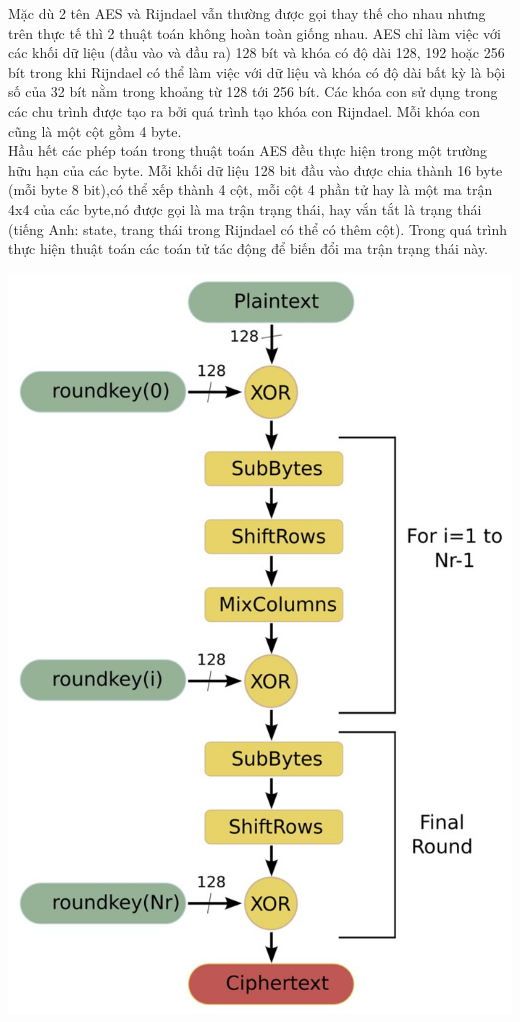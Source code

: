 \documentclass[paper=a4, fontsize=11pt]{scrartcl}	%
\numberwithin{equation}{section}															%
\numberwithin{figure}{section}																%
\numberwithin{table}{section}																%
\begin{document}
    
	Mặc dù 2 tên AES và Rijndael vẫn thường được gọi thay thế cho nhau nhưng trên thực tế thì 2 thuật toán không hoàn toàn giống nhau. AES chỉ làm việc với các khối dữ liệu (đầu vào và đầu ra) 128 bít và khóa có độ dài 128, 192 hoặc 256 bít trong khi Rijndael có thể làm việc với dữ liệu và khóa có độ dài bất kỳ là bội số của 32 bít nằm trong khoảng từ 128 tới 256 bít. Các khóa con sử dụng trong các chu trình được tạo ra bởi quá trình tạo khóa con Rijndael. Mỗi khóa con cũng là một cột gồm 4 byte.\\
	
	
	Hầu hết các phép toán trong thuật toán AES đều thực hiện trong một trường hữu hạn của các byte. Mỗi khối dữ liệu 128 bit đầu vào được chia thành 16 byte (mỗi byte 8 bit),có thể xếp thành 4 cột, mỗi cột 4 phần tử hay là một ma trận 4x4 của các byte,nó được gọi là ma trận trạng thái, hay vắn tắt là trạng thái (tiếng Anh: state, trang thái trong Rijndael có thể có thêm cột). Trong quá trình thực hiện thuật toán các toán tử tác động để biến đổi ma trận trạng thái này.	\\
	


	\begin{center}
		\includegraphics[scale=1.5]{AES_1}
	\end{center}
	
\end{document}
